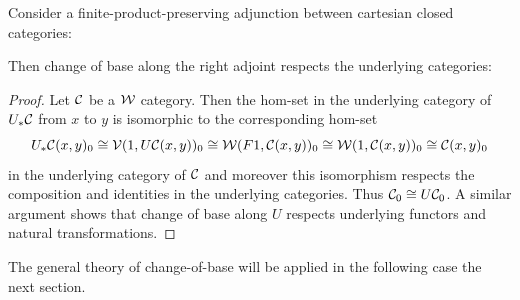 \begin{lemma}\label{lem:right-of-monoidal-adj-ucats}
   Consider a finite-product-preserving adjunction between cartesian closed categories:
\begin{center}
\end{center}
Then change of base along the right adjoint respects the underlying categories:
\begin{center}
\end{center}
\end{lemma}
\begin{proof}
Let ${\mathord{\mathcal{C}}}$ be a ${\mathord{\mathcal{W}}}$ category. Then the hom-set in the underlying category of $U_*{\mathord{\mathcal{C}}}$ from $x$ to $y$ is isomorphic to the corresponding hom-set
\[ U_*{\mathord{\mathcal{C}}}(x,y)_0 \cong {\mathord{\mathcal{V}}}(1, U{\mathord{\mathcal{C}}}(x,y))_0 \cong {\mathord{\mathcal{W}}}(F1,{\mathord{\mathcal{C}}}(x,y))_0 \cong {\mathord{\mathcal{W}}}(1,{\mathord{\mathcal{C}}}(x,y))_0 \cong {\mathord{\mathcal{C}}}(x,y)_0\]
in the underlying category of ${\mathord{\mathcal{C}}}$ and moreover this isomorphism respects the composition and identities in the underlying categories. Thus ${\mathord{\mathcal{C}}}_0 \cong U{\mathord{\mathcal{C}}}_0$. A similar argument shows that change of base along $U$ respects underlying functors and natural transformations.
\end{proof}


The general theory of change-of-base will be applied in the following case the next section.


